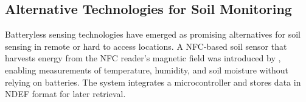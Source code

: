 \documentclass[conference]{IEEEtran}
\begin{document}




\subsection{Alternative Technologies for Soil Monitoring}

Batteryless sensing technologies have emerged as promising alternatives for soil sensing in remote or hard to access locations. A NFC-based soil sensor that harvests energy from the NFC reader’s magnetic field was introduced by \cite{boada_2018_batteryless}, enabling measurements of temperature, humidity, and soil moisture without relying on batteries. The system integrates a microcontroller and stores data in NDEF format for later retrieval. 
\end{document}
